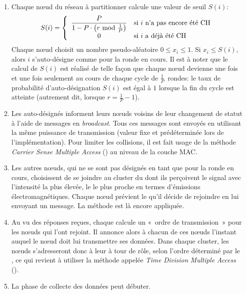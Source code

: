 \begin{enumerate}
    \item Chaque nœud du réseau à partitionner calcule une valeur de seuil $S(i)$:
        \[
            S(i) = \left\{
            \begin{array}{cl}
                \displaystyle \frac{P}{1-P\cdot\left(r\mbox{ mod }\frac{1}{P}\right)} & \mbox{si }i\mbox{ n'a pas encore été \CH}\\
                                                                                    0 & \mbox{si }i\mbox{ a déjà été \CH}
            \end{array}
            \right.
        \]
        Chaque nœud choisit un nombre pseudo-aléatoire $0 \le x_{i}\le 1$.
        Si $x_{i} \le S(i)$, alors $i$ s'auto-désigne comme \CH pour la ronde en cours.
        Il est à noter que le calcul de $S(i)$ est réalisé de telle façon que chaque nœud devienne \ch une fois et une fois seulement au cours de chaque cycle de $\frac{1}{P}$~rondes: le taux de probabilité d'auto-désignation $S(i)$ est égal à $1$ lorsque la fin du cycle est atteinte (autrement dit, lorsque $r = \frac{1}{P}-1$).
    \item Les \chs auto-désignés informent leurs nœuds voisins de leur changement de statut à l'aide de messages en \textit{broadcast}.
        Tous ces messages sont envoyés en utilisant la même puissance de transmission (valeur fixe et prédéterminée lors de l'implémentation).
        Pour limiter les collisions, il est fait usage de la méthode \textit{Carrier Sense Multiple Access} (\csma) au niveau de la couche MAC.
    \item Les autres nœuds, qui ne se sont pas désignés en tant que \chs pour la ronde en cours, choisissent de se joindre au cluster du \CH dont ils perçoivent le signal avec l'intensité la plus élevée, \cad le \CH le plus proche en termes d'émissions électromagnétiques.
        Chaque nœud prévient le \ch qu'il décide de rejoindre en lui envoyant un message.
        La méthode \csma est là encore appliquée.
    \item Au vu des réponses reçues, chaque \ch calcule un «~ordre de transmission~» pour les nœuds qui l'ont rejoint.
        Il annonce alors à chacun de ces nœuds l'instant auquel le nœud doit lui transmettre ses données.
        Dans chaque cluster, les nœuds s'adresseront donc à leur \ch à tour de rôle, selon l'ordre déterminé par le \CH, ce qui revient à utiliser la méthode appelée \textit{Time Division Multiple Access} (\tdma).
    \item La phase de collecte des données peut débuter.

\end{enumerate}
